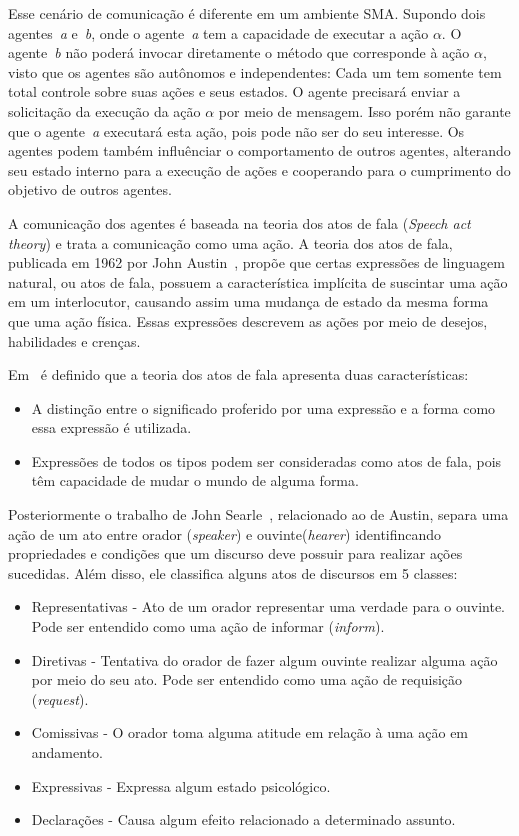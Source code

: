 Esse cenário de comunicação é diferente em um ambiente SMA. Supondo dois agentes~\emph{a} e~\emph{b}, onde o agente~\emph{a} tem a capacidade de executar a ação $\alpha$. O agente~\emph{b} não poderá invocar diretamente o método que corresponde à ação $\alpha$, visto que os agentes são autônomos e independentes: Cada um tem somente tem total controle sobre suas ações e seus estados. O agente precisará enviar a solicitação da execução da ação $\alpha$ por meio de mensagem. Isso porém não garante que o agente~\emph{a} executará esta ação, pois pode não ser do seu interesse. Os agentes podem também influênciar o comportamento de outros agentes, alterando seu estado interno para a execução de ações e cooperando para o cumprimento do objetivo de outros agentes.

A comunicação dos agentes é baseada na teoria dos atos de fala (\emph{Speech act theory}) e trata a comunicação como uma ação. A teoria dos atos de fala, publicada em 1962 por John Austin~\cite{austin62}, propõe que certas expressões de linguagem natural, ou atos de fala, possuem a característica implícita de suscintar uma ação em um interlocutor, causando assim uma mudança de estado da mesma forma que uma ação física. Essas expressões descrevem as ações por meio de desejos, habilidades e crenças.

Em~\cite{verschueren09} é definido que a teoria dos atos de fala apresenta duas características:
\begin{itemize}
	\item A distinção entre o significado proferido por uma expressão e a forma como essa expressão é utilizada.
	\item Expressões de todos os tipos podem ser consideradas como atos de fala, pois têm capacidade de mudar o mundo de alguma forma.
\end{itemize}

Posteriormente o trabalho de John Searle~\cite{searle69}, relacionado ao de Austin, separa uma ação de um ato entre orador (\emph{speaker}) e ouvinte(\emph{hearer}) identifincando propriedades e condições que um discurso deve possuir para realizar ações sucedidas. Além disso, ele classifica alguns atos de discursos em 5 classes:
\begin{itemize}
	\item Representativas - Ato de um orador representar uma verdade para o ouvinte. Pode ser entendido como uma ação de informar (\emph{inform}).
	\item Diretivas - Tentativa do orador de fazer algum ouvinte realizar alguma ação por meio do seu ato. Pode ser entendido como uma ação de requisição (\emph{request}).
	\item Comissivas - O orador toma alguma atitude em relação à uma ação em andamento.
	\item Expressivas - Expressa algum estado psicológico.
	\item Declarações - Causa algum efeito relacionado a determinado assunto.
\end{itemize}

